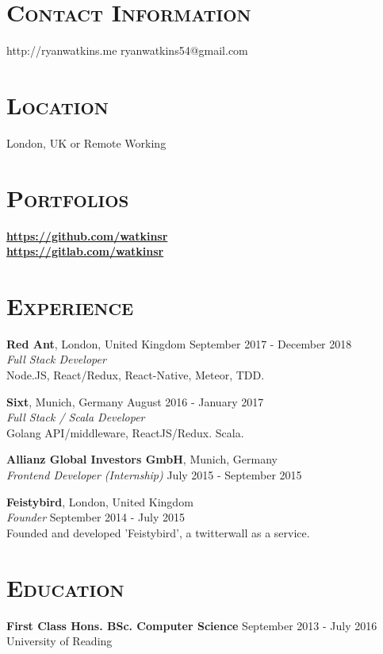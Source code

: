 \documentclass[line, margin, 10pt]{res}
\begin{document}
\renewcommand{\namefont}{ \LARGE \bf }


\begin{resume}

\section{\textsc{Contact Information}}
http://ryanwatkins.me \hfill {ryanwatkins54@gmail.com}\\

\section{\textsc{Location}}
London, UK or Remote Working

\section{\textsc{Portfolios}}
        {\bf \url{https://github.com/watkinsr}}\\
        {\hfill {\bf \url{https://gitlab.com/watkinsr}}}

\section{\textsc{Experience}}

{\bf Red Ant}, London, United Kingdom {\hfill September 2017 -  December 2018}\\
{\it Full Stack Developer} \\
Node.JS, React/Redux, React-Native, Meteor, TDD.

{\bf Sixt}, Munich, Germany {\hfill August 2016 - January 2017}\\
{\it Full Stack / Scala Developer} \\
Golang API/middleware, ReactJS/Redux. Scala.

{\bf Allianz Global Investors GmbH}, Munich, Germany\\
{\it Frontend Developer (Internship)} {\hfill July 2015 - September 2015}

{\bf Feistybird}, London, United Kingdom \\
\textit{Founder} \hfill {September 2014 - July 2015}\\
Founded and developed 'Feistybird', a twitterwall as a service.


\section{\textsc{Education}}
{\bf First Class Hons. BSc. Computer Science}  {\hfill September 2013 - July 2016}\\
University of Reading


\end{resume}
\end{document}
